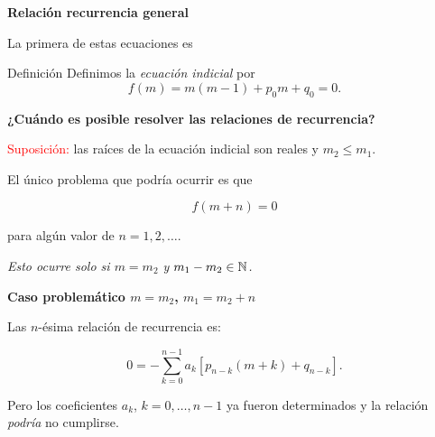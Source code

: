 \begin{frame}[fragile]{\textbf{Relación recurrencia general}}

La primera de estas ecuaciones es
\begin{block}{Definición } Definimos la  \emph{ecuación indicial} por
\begin{equation}\label{eq:eq_indicial}
  f(m)=m(m-1)+p_0m+q_0=0.
\end{equation}

\end{block}

\end{frame}



\begin{frame}[fragile]{\textbf{¿Cuándo es posible resolver las relaciones de recurrencia? }}

\textcolor{red}{Suposición: } las raíces de la ecuación indicial son reales y  
$m_2\leq m_1$.



El único problema que podría ocurrir es que  

\[f(m+n)=0\]

para algún valor de $n=1,2,\ldots$.  


\emph{Esto ocurre solo si $m=m_2$ y $m_1-m_2\in\mathbb{N}$.}



\end{frame}



\begin{frame}[fragile]{\textbf{Caso problemático $m=m_2$, $m_1=m_2+n$}}

Las $n$-ésima relación de recurrencia es:

\begin{equation}\label{eq:ec_enter} 0=-\sum_{k=0}^{n-1}a_k\left[p_{n-k}(m+k) +
q_{n-k}\right].
\end{equation}

Pero los coeficientes $a_k$, $k=0,\ldots,n-1$ ya fueron determinados y la relación \emph{podría} no cumplirse.

\end{frame}



